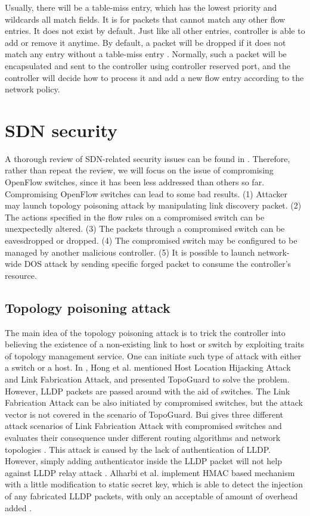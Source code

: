 Usually, there will be a table-miss entry, which has the lowest priority and wildcards all match fields. It is for packets that cannot match any other flow entries. It does not exist by default. Just like all other entries, controller is able to add or remove it anytime. By default, a packet will be dropped if it does not match any entry without a table-miss entry \cite{OF_SPEC}. Normally, such a packet will be encapsulated and sent to the controller using controller reserved port, and the controller will decide how to process it and add a new flow entry according to the network policy. 

\section{SDN security}
\label{SDN security}
A thorough review of SDN-related security issues can be found in \cite{LAB14, CM, SOS13, KJK}. Therefore, rather than repeat the review, we will focus on the issue of compromising OpenFlow switches, since it has been less addressed than others so far. Compromising OpenFlow switches can lead to some bad results. (1) Attacker may launch topology poisoning attack by manipulating link discovery packet. (2) The actions specified in the flow rules on a compromised switch can be unexpectedly altered. (3) The packets through a compromised switch can be eavesdropped or dropped. (4) The compromised switch may be configured to be managed by another malicious controller. (5) It is possible to launch network-wide DOS attack by sending specific forged packet to consume the controller's resource.

\subsection{Topology poisoning attack}
The main idea of the topology poisoning attack is to trick the controller into believing the existence of a non-existing link to host or switch by exploiting traits of topology management service. One can initiate such type of attack with either a switch or a host. In \cite{HXWG15}, Hong et al. mentioned Host Location Hijacking Attack and Link Fabrication Attack, and presented TopoGuard to solve the problem. However, LLDP packets are passed around with the aid of switches. The Link Fabrication Attack can be also initiated by compromised switches, but the attack vector  is not covered in the scenario of TopoGuard. Bui gives three different attack scenarios of Link Fabrication Attack with compromised switches and evaluates their consequence under different routing algorithms and network topologies \cite{TTB15}. This attack is caused by the lack of authentication of LLDP. However, simply adding authenticator inside the LLDP packet will not help against LLDP relay attack \cite{HXWG15}. Alharbi et al. implement HMAC based mechanism with a little modification to static secret key, which is able to detect the injection of any fabricated LLDP packets, with only an acceptable of amount of overhead added \cite{ATPP15}.

